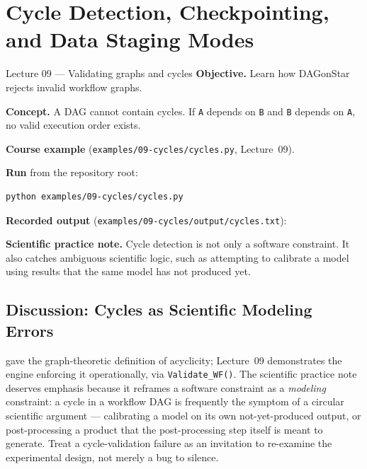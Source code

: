 \chapter{Cycle Detection, Checkpointing, and Data Staging Modes}
\label{ch:lessons-05-07}

\begin{lessonbox}{Lecture 09 --- Validating graphs and cycles}
\textbf{Objective.} Learn how DAGonStar rejects invalid workflow graphs.

\textbf{Concept.} A DAG cannot contain cycles. If \texttt{A} depends on
\texttt{B} and \texttt{B} depends on \texttt{A}, no valid execution order
exists.

\textbf{Course example} (\texttt{examples/09-cycles/cycles.py}, Lecture~09).


\textbf{Run} from the repository root:
\begin{lstlisting}[style=bash]
python examples/09-cycles/cycles.py
\end{lstlisting}

\textbf{Recorded output} (\texttt{examples/09-cycles/output/cycles.txt}):


\textbf{Scientific practice note.} Cycle detection is not only a software
constraint. It also catches ambiguous scientific logic, such as attempting
to calibrate a model using results that the same model has not produced yet.
\end{lessonbox}

\section{Discussion: Cycles as Scientific Modeling Errors}

 gave the graph-theoretic definition of acyclicity;
Lecture~09 demonstrates the engine enforcing it operationally, via
\texttt{Validate\_WF()}. The scientific practice note deserves emphasis
because it reframes a software constraint as a \emph{modeling} constraint: a
cycle in a workflow DAG is frequently the symptom of a circular scientific
argument --- calibrating a model on its own not-yet-produced output, or
post-processing a product that the post-processing step itself is meant to
generate. Treat a cycle-validation failure as an invitation to re-examine the
experimental design, not merely a bug to silence.

